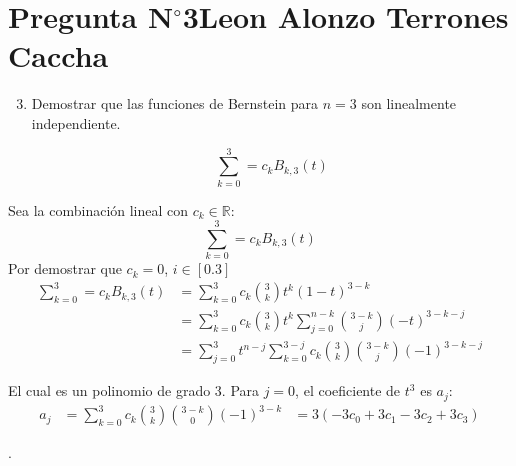 \section{Pregunta N$^{\circ}$3\qquad Leon Alonzo Terrones Caccha}

\begin{frame}
    \begin{enumerate}\setcounter{enumi}{2}
        \item
              Demostrar que las funciones de Bernstein para $n=3$ son linealmente independiente.

              \[\sum_{k=0}^{3}=c_{k}B_{k,3}(t)\]

    \end{enumerate}

    \begin{solution}
        Sea la combinación lineal con $c_k\in\mathbb{R}:$
        \[\sum_{k=0}^{3}=c_{k}B_{k,3}(t)\]
        Por demostrar que $c_k=0$, $i\in[0.3]$
        \begin{align*}
            \sum_{k=0}^{3}=c_{k}B_{k,3}(t) & =\sum_{k=0}^{3}c_k\binom{3}{k}t^k(1-t)^{3-k}                                        \\
                                           & =\sum_{k=0}^{3}{c_k\binom{3}{k}t^k\sum_{j=0}^{n-k}\binom{3-k}{j}{(-t)^{3-k-j}}}     \\
                                           & =\sum_{j=0}^{3}{t^{n-j}\sum_{k=0}^{3-j}{c_k\binom{3}{k}\binom{3-k}{j}(-1)^{3-k-j}}}
        \end{align*}

        El cual es un polinomio de grado 3.
        Para $j=0$, el coeficiente de $t^3$ es $a_j$:
        \begin{align*}
            a_j&=\sum_{k=0}^{3}{c_k\binom{3}{k}\binom{3-k}{0}(-1)^{3-k}} & =3(-3c_0+3c_1-3c_2+3c_3)
        \end{align*}
    \end{solution}
\end{frame}

\begin{frame}
    \begin{solution}
        .
    \end{solution}
\end{frame}